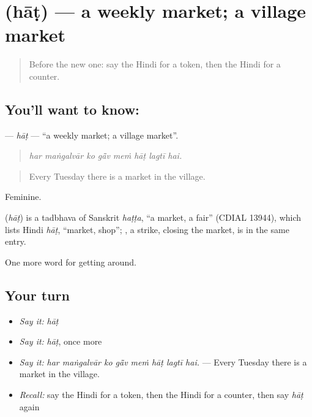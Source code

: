 \section[\texorpdfstring{\hi{हाट} (hāṭ)}{हाट (hāṭ)}]{ (hāṭ) — a weekly market; a village market}

\label{lesson:HI-C433-hat}



\begin{quote}
Before the new one: say the Hindi for a token, then the Hindi for a counter.
\end{quote}

\subsection*{You'll want to know: }
\textbf{} — \emph{hāṭ} — \textquotedblleft{}a weekly market; a village market\textquotedblright{}.

\begin{quote}
       
\end{quote}

\begin{quote}
\emph{har maṅgalvār ko gā̃v meṁ hāṭ lagtī hai.}
\end{quote}

\begin{quote}
Every Tuesday there is a market in the village.
\end{quote}

Feminine.

\begin{cousinweb}
\textbf{} (\emph{hāṭ}) is a tadbhava of Sanskrit \emph{haṭṭa}, \textquotedblleft{}a market, a fair\textquotedblright{} (CDIAL 13944), which lists Hindi \emph{hāṭ}, \textquotedblleft{}market, shop\textquotedblright{}; , a strike, closing the market, is in the same entry.
\end{cousinweb}

\begin{grammarlens}[title={What you've built}]
One more word for getting around.
\end{grammarlens}

\subsection*{Your turn}
\begin{itemize}
\raggedright
  \item \emph{Say it:} \emph{hāṭ}
  \item \emph{Say it:} \emph{hāṭ}, once more
  \item \emph{Say it:} \emph{har maṅgalvār ko gā̃v meṁ hāṭ lagtī hai.} — Every Tuesday there is a market in the village.
  \item \emph{Recall:} say the Hindi for a token, then the Hindi for a counter, then say \emph{hāṭ} again
\end{itemize}

